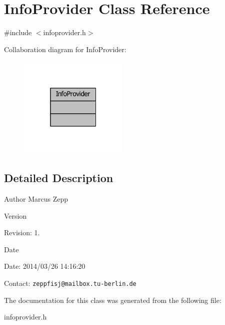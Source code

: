 \section{Info\-Provider Class Reference}
\label{classInfoProvider}


{\ttfamily \#include $<$infoprovider.\-h$>$}



Collaboration diagram for Info\-Provider\-:
\nopagebreak
\begin{figure}[H]
\begin{center}
\leavevmode
\includegraphics[width=148pt]{d2/dd5/classInfoProvider__coll__graph}
\end{center}
\end{figure}


\subsection{Detailed Description}
\begin{DoxyAuthor}{Author}
Marcus Zepp
\end{DoxyAuthor}
\begin{DoxyVersion}{Version}

\end{DoxyVersion}
\begin{DoxyParagraph}{Revision\-:}
1. 
\end{DoxyParagraph}


\begin{DoxyDate}{Date}

\end{DoxyDate}
\begin{DoxyParagraph}{Date\-:}
2014/03/26 14\-:16\-:20 
\end{DoxyParagraph}


Contact\-: {\tt zeppfisj@mailbox.\-tu-\/berlin.\-de} 

The documentation for this class was generated from the following file\-:\begin{DoxyCompactItemize}
\item 
infoprovider.\-h\end{DoxyCompactItemize}
